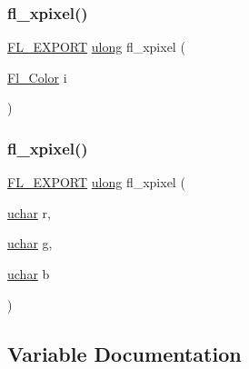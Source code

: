 \mbox{\label{x_8_h_a319bf8295cfaddf7c791c35d9a49ba2e}} 
\subsubsection{\texorpdfstring{fl\+\_\+xpixel()}{fl\_xpixel()}\hspace{0.1cm}{\footnotesize\ttfamily [1/2]}}
{\footnotesize\ttfamily \hyperlink{_fl___export_8_h_aa9ba29a18aee9d738370a06eeb4470fc}{F\+L\+\_\+\+E\+X\+P\+O\+RT} \hyperlink{fl__types_8h_a718b4eb2652c286f4d42dc18a8e71a1a}{ulong} fl\+\_\+xpixel (\begin{DoxyParamCaption}\item[{\hyperlink{_enumerations_8_h_a8b762953646f8abee866061f1af78a6a}{Fl\+\_\+\+Color}}]{i }\end{DoxyParamCaption})}

\mbox{\label{x_8_h_ac57e210f1e64541b0066b2005f50b0e4}} 
\subsubsection{\texorpdfstring{fl\+\_\+xpixel()}{fl\_xpixel()}\hspace{0.1cm}{\footnotesize\ttfamily [2/2]}}
{\footnotesize\ttfamily \hyperlink{_fl___export_8_h_aa9ba29a18aee9d738370a06eeb4470fc}{F\+L\+\_\+\+E\+X\+P\+O\+RT} \hyperlink{fl__types_8h_a718b4eb2652c286f4d42dc18a8e71a1a}{ulong} fl\+\_\+xpixel (\begin{DoxyParamCaption}\item[{\hyperlink{fl__types_8h_a65f85814a8290f9797005d3b28e7e5fc}{uchar}}]{r,  }\item[{\hyperlink{fl__types_8h_a65f85814a8290f9797005d3b28e7e5fc}{uchar}}]{g,  }\item[{\hyperlink{fl__types_8h_a65f85814a8290f9797005d3b28e7e5fc}{uchar}}]{b }\end{DoxyParamCaption})}



\subsection{Variable Documentation}
\mbox{\label{x_8_h_afcd48cb4e62b0bfee6102e98c7d0cb38}} 
